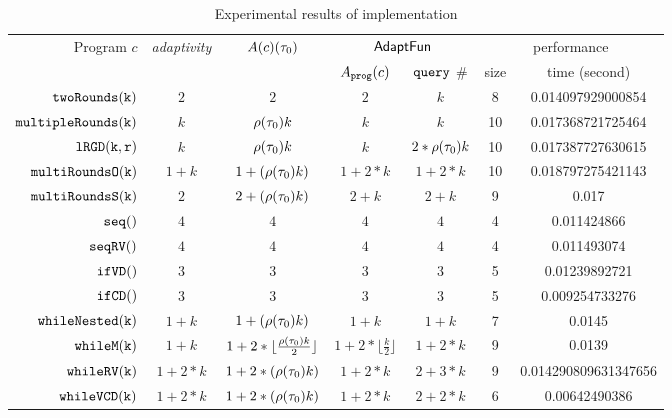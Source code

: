 \begin {table}[H]
    \caption{Experimental results of {\THESYSTEM} implementation}
        \label{tb:adapt-imp}
        \begin{center}
        \centering
{\footnotesize
        \begin{tabular}{ r | c | c | c | c | c | c }
        \multirow{2}{*}{Program $c$} & 
        \multirow{2}{*}{\emph{adaptivity}} 
         & \multirow{2}{*}{$A(c) (\mathtt{\tau}_0)$} 
         & \multicolumn{2}{c|}{$\textsf{AdaptFun}$}
         & \multicolumn{2}{c}{performance} \\ 
         \cline{4-7}
         & & & $A_{\mathtt{prog}}(c)$ & ${\tt query}$ \# & size & time (second) \\
         \hline \hline
         $  \mathtt{twoRounds(k)}$ & $2$ & $2$ & $2$ & $k$ & 8 & 0.014097929000854 \\
         $  \mathtt{multipleRounds(k)}$ & $k$ & $ \rho(\mathtt{\tau}_0) k $ & $k$ & $k$  &  10 & 0.017368721725464  \\
         $  \mathtt{lRGD(k, r)}$ & $k$ & $\rho(\mathtt{\tau}_0) k$ & $k$ & $2 * \rho(\mathtt{\tau}_0) k$  &  10 & 0.017387727630615  \\
         $  \mathtt{multiRoundsO(k)}$ & $1 + k$ & $1 + (\rho(\mathtt{\tau}_0) k) $  & $1 +2 * k$ & $1 + 2*k$  &  10 & 0.018797275421143  \\
         $  \mathtt{multiRoundsS(k)}$    & $2$ & $2 + (\rho(\mathtt{\tau}_0) k) $ & $2 + k$ & $2 + k$  &  9 & 0.017  \\
         $  \mathtt{seq()}$ & $4$ & $4$ & $4$ & $4$ & 4 & 0.011424866\\ 
         $  \mathtt{seqRV()}$ & $4$ & $4$ & $4$ & $4$ & 4 & 0.011493074\\  
         $  \mathtt{ifVD()}$ & $3$ & $3$ & $3$ & $3$ & 5 & 0.01239892721 \\
         $  \mathtt{ifCD()}$ & $3$ & $3$ & $3$ & $3$  & 5 & 0.009254733276   \\
         $  \mathtt{whileNested(k)}$ & $1+k$ & $1+ (\rho(\mathtt{\tau}_0) k)$ & $1+k$  &  $1+k$ & 7 & 0.0145 \\
         $  \mathtt{whileM(k)}$ & $1 + k$ & $1 +2 * \lfloor \frac{\rho(\mathtt{\tau}_0) k}{2} \rfloor$ & $1 +2 * \lfloor \frac{k}{2} \rfloor$ & $1 + 2 * k$  &  9 & 0.0139  \\
         $  \mathtt{whileRV(k)}$ & $1 + 2*k$ & $1 + 2*(\rho(\mathtt{\tau}_0) k)$ & $1 + 2*k$ & $2 + 3 * k$  &  9 & 0.014290809631347656  \\
         $  \mathtt{whileVCD(k)}$ & $1 + 2*k$ & $1 + 2*(\rho(\mathtt{\tau}_0) k)$ & $1 + 2 * k$ & $2 + 2 * k$  &  6 & 0.00642490386  \\

\end{tabular}}
\end{center}
\end{table}
